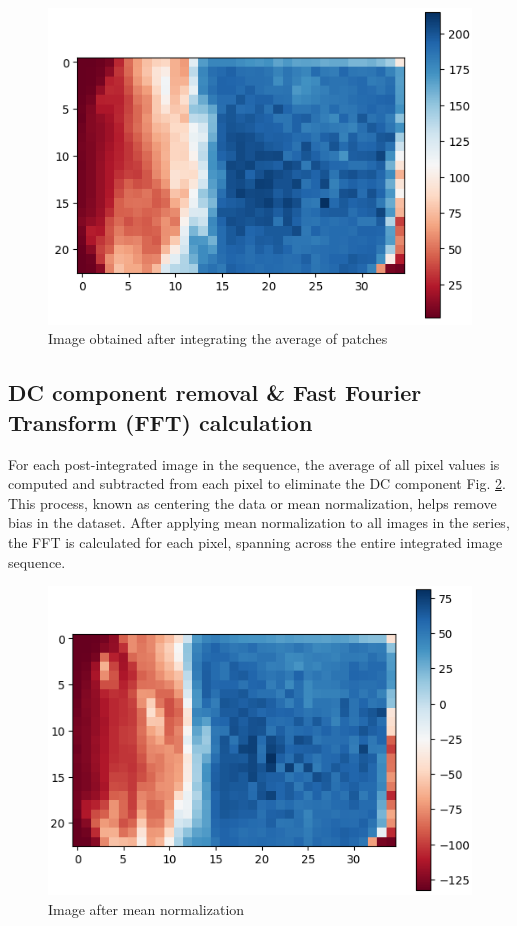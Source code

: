 \documentclass[conference]{IEEEtran}
\begin{document}
		\begin{figure}[H]
		\includegraphics[scale=.51]{plot/pool.png}
		\caption{Image obtained after integrating the average of patches}\label{fig:k3}
	\end{figure}
	
\subsection{DC component removal \& Fast Fourier Transform (FFT) calculation}


For each post-integrated image in the sequence, the average of all pixel values is computed and subtracted from each pixel to eliminate the DC component Fig. \ref{fig:k4}. This process, known as centering the data or mean normalization, helps remove bias in the dataset. After applying mean normalization to all images in the series, the FFT is calculated for each pixel, spanning across the entire integrated image sequence.

		\begin{figure}[H]
	\includegraphics[scale=.51]{plot/pool2.png}
	\caption{Image after mean normalization}\label{fig:k4}
\end{figure}
\end{document}
